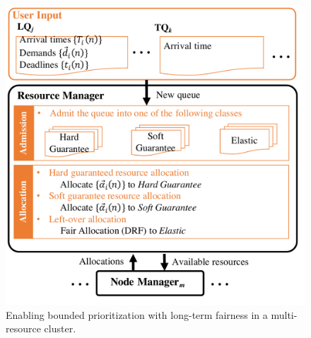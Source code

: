 \begin{figure}[h]
	\centering
	\includegraphics[width=0.8\linewidth]{fig/diagram}
	\vspace{-0.2in}
	\caption{Enabling bounded prioritization with long-term fairness in a  multi-resource cluster.}
	\vspace{-0.2in}
	\label{fig:system_design}
\end{figure}